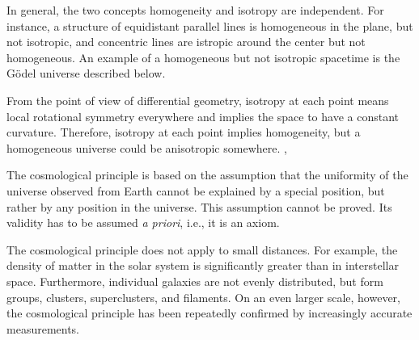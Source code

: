 In general, the two concepts homogeneity and isotropy are independent. For instance, a structure of equidistant parallel lines is homogeneous in the plane, but not isotropic, and concentric lines are istropic around the center but not homogeneous. An example of a homogeneous but not isotropic spacetime is the Gödel universe described below.


\begin{bem}
\label{bem:isotropy-and-constant-curvature}
From the point of view of differential geometry, isotropy at each point means local rotational symmetry everywhere and implies the space to have a constant curvature. Therefore, isotropy at each point implies homogeneity, but a homogeneous universe could be anisotropic somewhere.
\cite[448]{Karttunen-et-al-2000}, \cite[130]{Sexl-Urbantke-1987}
\end{bem}

The cosmological principle is based on the assumption that the uniformity of the universe observed from Earth cannot be explained by a special position, but rather by any position in the universe. This assumption cannot be proved. Its validity has to be assumed \emph{a priori}, i.e., it is an axiom.

The cosmological principle does not apply to small distances. For example, the density of matter in the solar system is significantly greater than in interstellar space. Furthermore, individual galaxies are not evenly distributed, but form groups, clusters, superclusters, and filaments. On an even larger scale, however, the cosmological principle has been repeatedly confirmed by increasingly accurate measurements.


